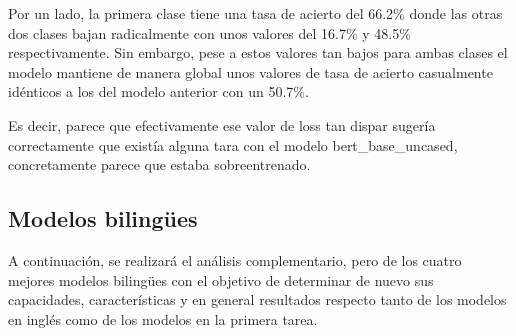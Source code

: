 Por un lado, la primera clase tiene una tasa de acierto del 66.2\% donde las otras dos clases bajan radicalmente con unos valores del 16.7\% y 48.5\% respectivamente. Sin embargo, pese a estos valores tan bajos para ambas clases el modelo mantiene de manera global unos valores de tasa de acierto casualmente idénticos a los del modelo anterior con un 50.7\%.

Es decir, parece que efectivamente ese valor de loss tan dispar sugería correctamente que existía alguna tara con el modelo bert\_base\_uncased, concretamente parece que estaba sobreentrenado.

\subsection{Modelos bilingües}

A continuación, se realizará el análisis complementario, pero de los cuatro mejores modelos bilingües con el objetivo de determinar de nuevo sus capacidades, características y en general resultados respecto tanto de los modelos en inglés como de los modelos en la primera tarea.


